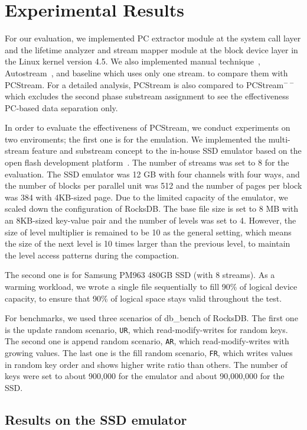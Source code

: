 \section{Experimental Results}
For our evaluation, we implemented PC extractor module at the 
system call layer 
and the lifetime analyzer and stream mapper module 
at the block device layer in the Linux kernel version 4.5.
We also implemented manual technique~\cite{MultiStream}, 
Autostream~\cite{AutoStream}, and
baseline which uses only one stream.
to compare them with {\sf PCStream}.
For a detailed analysis, {\sf PCStream} is also compared to {\sf PCStream}$^{--}$
which excludes the second phase substream assignment 
to see the effectiveness PC-based data separation only.

In order to evaluate the effectiveness of {\sf PCStream},
we conduct experiments on two enviroments; the first one is 
for the emulation.
We implemented the multi-stream feature and substream concept
to the in-house SSD emulator
based on the open flash development platform~\cite{AMF}.
The number of streams was set to 8 for the evaluation.
The SSD emulator was 12 GB with four channels with four ways, and 
the number of blocks per parallel unit was 512 and
the number of pages per block was 384 with 4KB-sized page.
Due to the limited capacity of the emulator, 
we scaled down the configuration of RocksDB.
The base file size is set to 8 MB
with an 8KB-sized key-value pair and the number of levels was set to 4.
However, the size of level multiplier is remained to be 10 as the general setting,
which means the size of the next level is 10 times larger than the previous level,
to maintain the level access patterns during the compaction.

The second one is for Samsung PM963 480GB SSD (with 8 streams).
As a warming workload, we wrote a single file sequentially to fill 90\%
of logical device capacity, to ensure that 90\% of logical space stays valid
throughout the test.

For benchmarks, we used three scenarios of db\_bench of RocksDB.
The first one is the update random scenario, {\tt UR}, which read-modify-writes for random keys. 
The second one is append random scenario, {\tt AR}, which read-modify-writes with growing values.
The last one is the fill random scenario, {\tt FR}, which writes values in random key order and 
shows higher write ratio than others.
The number of keys were set to about 900,000 for the emulator and about 90,000,000 for
the SSD.

\subsection{Results on the SSD emulator}

